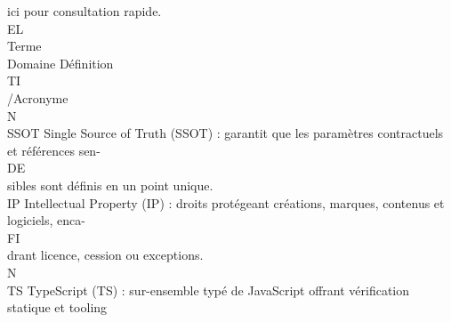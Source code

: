 \vspace{0.5em}
ici pour consultation rapide.\\
\vspace{0.5em}
\vspace{0.5em}
\vspace{0.5em}
\vspace{0.5em}
EL\\
Terme\\
Domaine                            Définition\\
\vspace{0.5em}
\vspace{0.5em}
\vspace{0.5em}
\vspace{0.5em}
TI\\
/Acronyme\\
\vspace{0.5em}
\vspace{0.5em}
\vspace{0.5em}
\vspace{0.5em}
N\\
SSOT                                                                         Single Source of Truth (SSOT) : garantit que les paramètres contractuels et références sen-\\
\vspace{0.5em}
\vspace{0.5em}
\vspace{0.5em}
\vspace{0.5em}
DE\\
sibles sont définis en un point unique.\\
\vspace{0.5em}
IP                                                                           Intellectual Property (IP) : droits protégeant créations, marques, contenus et logiciels, enca-\\
\vspace{0.5em}
\vspace{0.5em}
\vspace{0.5em}
\vspace{0.5em}
FI\\
drant licence, cession ou exceptions.\\
\vspace{0.5em}
\vspace{0.5em}
\vspace{0.5em}
N\\
TS                                                                           TypeScript (TS) : sur-ensemble typé de JavaScript offrant vérification statique et tooling\\
